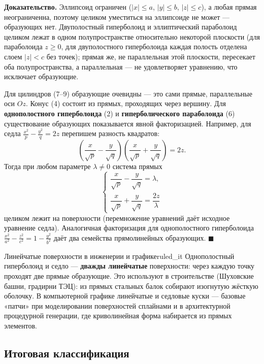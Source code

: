 \documentclass[12pt,a4paper]{article}
\newenvironment{myproof}{\noindent\textbf{Доказательство.}}{\hfill$\blacksquare$}
\begin{document}
\begin{myproof}
  Эллипсоид ограничен ($|x| \le a$, $|y| \le b$, $|z| \le c$), а любая
  прямая неограниченна, поэтому целиком уместиться на эллипсоиде не
  может — образующих нет. Двуполостный гиперболоид и эллиптический
  параболоид целиком лежат в одном полупространстве относительно
  некоторой плоскости (для параболоида $z \ge 0$, для двуполостного
  гиперболоида каждая полость отделена слоем $|z| < c$ без точек);
  прямая же, не параллельная этой плоскости, пересекает оба
  полупространства, а параллельная — не удовлетворяет уравнению, что
  исключает образующие.

  Для цилиндров (7–9) образующие очевидны — это сами прямые,
  параллельные оси $Oz$. Конус (4) состоит из прямых, проходящих через
  вершину. Для \textbf{однополостного гиперболоида} (2) и
  \textbf{гиперболического параболоида} (6) существование образующих
  показывается явной факторизацией. Например, для седла
  $\frac{x^2}{p} - \frac{y^2}{q} = 2z$ перепишем разность квадратов:
  \[
    \left(\frac{x}{\sqrt p} - \frac{y}{\sqrt q}\right)
    \left(\frac{x}{\sqrt p} + \frac{y}{\sqrt q}\right) = 2z.
  \]
  Тогда при любом параметре $\lambda \ne 0$ система прямых
  \[
    \begin{cases}
      \dfrac{x}{\sqrt p} - \dfrac{y}{\sqrt q} = \lambda, \\[2mm]
      \dfrac{x}{\sqrt p} + \dfrac{y}{\sqrt q} = \dfrac{2z}{\lambda}
    \end{cases}
  \]
  целиком лежит на поверхности (перемножение уравнений даёт исходное
  уравнение седла). Аналогичная факторизация для однополостного
  гиперболоида
  $\frac{x^2}{a^2} - \frac{z^2}{c^2} = 1 - \frac{y^2}{b^2}$ даёт два
  семейства прямолинейных образующих.
\end{myproof}

\begin{remarkIT}{Линейчатые поверхности в инженерии и графике}{ruled_it}
  Однополостный гиперболоид и седло — \textbf{дважды линейчатые}
  поверхности: через каждую точку проходят две прямые образующие.
  Это используют в строительстве (Шуховские башни, градирни ТЭЦ): из
  прямых стальных балок собирают изогнутую жёсткую оболочку. В
  компьютерной графике линейчатые и седловые куски — базовые
  «патчи» при моделировании поверхностей сплайнами и в архитектурной
  процедурной генерации, где криволинейная форма набирается из прямых
  элементов.
\end{remarkIT}

\subsection*{Итоговая классификация}
\end{document}
